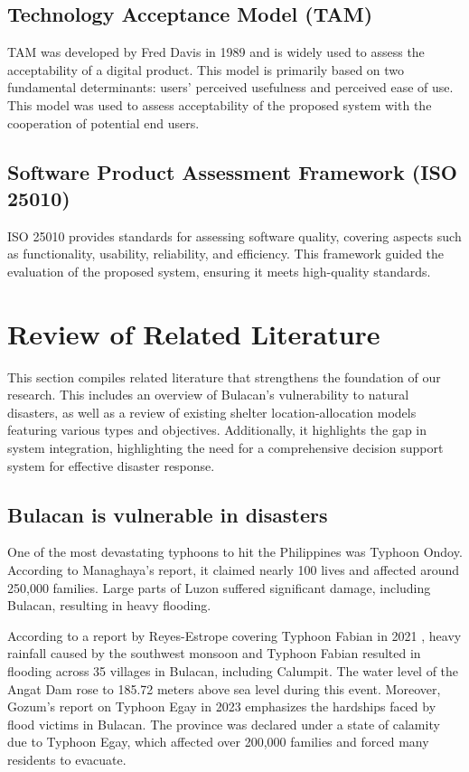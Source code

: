  \subsection{Technology Acceptance Model (TAM)}
 	TAM was developed by Fred Davis in 1989 and is widely used to assess the acceptability of a digital product. This model is primarily based on two fundamental determinants: users' perceived usefulness and perceived ease of use. This model was used to assess acceptability of the proposed system with the cooperation of potential end users.

\subsection{Software Product Assessment Framework (ISO 25010)}
	ISO 25010 provides standards for assessing software quality, covering aspects such as functionality, usability, reliability, and efficiency. This framework guided the evaluation of the proposed  system, ensuring it meets high-quality standards.

\section{Review of Related Literature}
	This section compiles related literature that strengthens the foundation of our research. This includes an overview of Bulacan's vulnerability to natural disasters, as well as a review of existing shelter location-allocation models featuring various types and objectives. Additionally, it highlights the gap in system integration, highlighting the need for a comprehensive decision support system for effective disaster response.
	
\subsection{Bulacan is vulnerable in disasters}
	One of the most devastating typhoons to hit the Philippines was Typhoon Ondoy. According to Managhaya's report, it claimed nearly 100 lives and affected around 250,000 families. Large parts of Luzon suffered significant damage, including Bulacan, resulting in heavy flooding. \parencite{James2009}

	According to a report by Reyes-Estrope covering Typhoon Fabian in 2021 \parencite{Carmela2021}, heavy rainfall caused by the southwest monsoon and Typhoon Fabian resulted in flooding across 35 villages in Bulacan, including Calumpit. The water level of the Angat Dam rose to 185.72 meters above sea level during this event. Moreover, Gozum's report on Typhoon Egay in 2023 \parencite{Iya2023} emphasizes the hardships faced by flood victims in Bulacan. The province was declared under a state of calamity due to Typhoon Egay, which affected over 200,000 families and forced many residents to evacuate.

